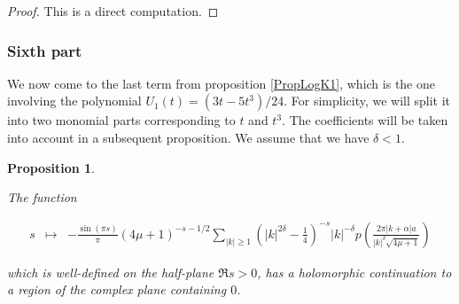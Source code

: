 \documentclass{jams-l}
\newtheorem{proposition}[theorem]{Proposition}
\theoremstyle{definition}
\theoremstyle{remark}
\numberwithin{equation}{section}
\begin{document}
            \begin{proof}
            
                This is a direct computation.            
            
            \end{proof}
            
            
        \subsubsection*{\textbf{Sixth part}}
        \label{ASixthPart}
        
            We now come to the last term from proposition \ref{PropLogK1}, which is the one involving the polynomial $U_1 \left( t \right) = \left( 3t - 5t^3 \right)/24$. For simplicity, we will split it into two monomial parts corresponding to $t$ and $t^3$. The coefficients will be taken into account in a subsequent proposition. We assume that we have $\delta < 1$.
            
            \begin{proposition}
            \label{PropA6Power1}
            
                The function
                
                \[ \begin{array}{lll}
                        s & \longmapsto & - \frac{\sin \left( \pi s \right)}{\pi} \left( 4 \mu + 1 \right)^{-s-1/2} \sum\limits_{\left \vert k \right \vert \geqslant 1} \left( \left \vert k \right \vert^{2 \delta} - \frac{1}{4} \right)^{-s} \left \vert k \right \vert^{- \delta} p \left( \frac{2 \pi \left \vert k + \alpha \right \vert a}{\left \vert k \right \vert^{\delta} \sqrt{4 \mu + 1}} \right)
                    \end{array} \]
                    
                \noindent which is well-defined on the half-plane $\Re s > 0$, has a holomorphic continuation to a region of the complex plane containing $0$.
            
            \end{proposition}
            
\end{document}
